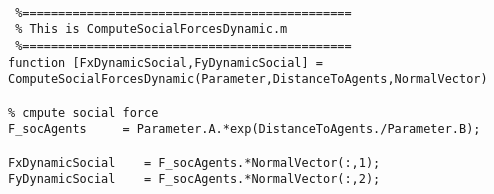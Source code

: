 
\lstset{basicstyle=\footnotesize\ttfamily}
    
    \begin{lstlisting}[breaklines]
    
 %==============================================
 % This is ComputeSocialForcesDynamic.m
 %==============================================
function [FxDynamicSocial,FyDynamicSocial] = ComputeSocialForcesDynamic(Parameter,DistanceToAgents,NormalVector)

% cmpute social force
F_socAgents     = Parameter.A.*exp(DistanceToAgents./Parameter.B);

FxDynamicSocial    = F_socAgents.*NormalVector(:,1);
FyDynamicSocial    = F_socAgents.*NormalVector(:,2);
\end{lstlisting}
    
